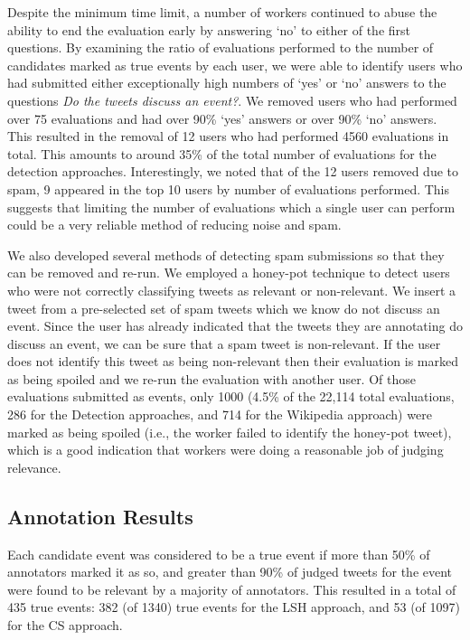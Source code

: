Despite the minimum time limit, a number of workers continued to abuse the ability to end the evaluation early by answering `no' to either of the first questions.
By examining the ratio of evaluations performed to the number of candidates marked as true events by each user, we were able to identify users who had submitted either exceptionally high numbers of `yes' or `no' answers to the questions \emph{Do the tweets discuss an event?}.
We removed users who had performed over 75 evaluations and had over 90\% `yes' answers or over 90\% `no' answers.
This resulted in the removal of 12 users who had performed 4560 evaluations in total.
This amounts to around 35\% of the total number of evaluations for the detection approaches.
Interestingly, we noted that of the 12 users removed due to spam, 9 appeared in the top 10 users by number of evaluations performed.
This suggests that limiting the number of evaluations which a single user can perform could be a very reliable method of reducing noise and spam.

We also developed several methods of detecting spam submissions so that they can be removed and re-run.
We employed a honey-pot technique to detect users who were not correctly classifying tweets as relevant or non-relevant.
We insert a tweet from a pre-selected set of spam tweets which we know do not discuss an event.
Since the user has already indicated that the tweets they are annotating do discuss an event, we can be sure that a spam tweet is non-relevant.
If the user does not identify this tweet as being non-relevant then their evaluation is marked as being spoiled and we re-run the evaluation with another user.
Of those evaluations submitted as events, only 1000 (4.5\% of the 22,114 total evaluations, 286 for the Detection approaches, and 714 for the Wikipedia approach) were marked as being spoiled (i.e., the worker failed to identify the honey-pot tweet), which is a good indication that workers were doing a  reasonable job of judging relevance.

\subsection{Annotation Results}
Each candidate event was considered to be a true event if more than 50\% of annotators marked it as so, and greater than 90\% of judged tweets for the event were found to be relevant by a majority of annotators.
This resulted in a total of 435 true events: 382 (of 1340) true events for the LSH approach, and 53 (of 1097) for the CS approach.

